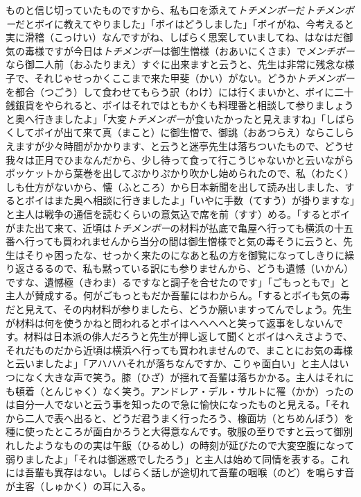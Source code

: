 \documentclass{book}
\begin{document}
ものと信じ切っていたものですから、私も口を添えて\emph{トチメンボー}だ\emph{トチメンボー}だとボイに教えてやりました」「ボイはどうしました」「ボイがね、今考えると実に滑稽（こっけい）なんですがね、しばらく思案していましてね、はなはだ御気の毒様ですが今日は\emph{トチメンボー}は御生憎様（おあいにくさま）で\emph{メンチボー}なら御二人前（おふたりまえ）すぐに出来ますと云うと、先生は非常に残念な様子で、それじゃせっかくここまで来た甲斐（かい）がない。どうか\emph{トチメンボー}を都合（つごう）して食わせてもらう訳（わけ）には行くまいかと、ボイに二十銭銀貨をやられると、ボイはそれではともかくも料理番と相談して参りましょうと奥へ行きましたよ」「大変\emph{トチメンボー}が食いたかったと見えますね」「しばらくしてボイが出て来て真（まこと）に御生憎で、御誂（おあつらえ）ならこしらえますが少々時間がかかります、と云うと迷亭先生は落ちついたもので、どうせ我々は正月でひまなんだから、少し待って食って行こうじゃないかと云いながらポッケットから葉巻を出してぷかりぷかり吹かし始められたので、私（わたく）しも仕方がないから、懐（ふところ）から日本新聞を出して読み出しました、するとボイはまた奥へ相談に行きましたよ」「いやに手数（てすう）が掛りますな」と主人は戦争の通信を読むくらいの意気込で席を前（すす）める。「するとボイがまた出て来て、近頃は\emph{トチメンボー}の材料が払底で亀屋へ行っても横浜の十五番へ行っても買われませんから当分の間は御生憎様でと気の毒そうに云うと、先生はそりゃ困ったな、せっかく来たのになあと私の方を御覧になってしきりに繰り返さるるので、私も黙っている訳にも参りませんから、どうも遺憾（いかん）ですな、遺憾極（きわま）るですなと調子を合せたのです」「ごもっともで」と主人が賛成する。何がごもっともだか吾輩にはわからん。「するとボイも気の毒だと見えて、その内材料が参りましたら、どうか願いますってんでしょう。先生が材料は何を使うかねと問われるとボイはへへへへと笑って返事をしないんです。材料は日本派の俳人だろうと先生が押し返して聞くとボイはへえさようで、それだものだから近頃は横浜へ行っても買われませんので、まことにお気の毒様と云いましたよ」「アハハハそれが落ちなんですか、こりゃ面白い」と主人はいつになく大きな声で笑う。膝（ひざ）が揺れて吾輩は落ちかかる。主人はそれにも頓着（とんじゃく）なく笑う。アンドレア・デル・サルトに罹（かか）ったのは自分一人でないと云う事を知ったので急に愉快になったものと見える。「それから二人で表へ出ると、どうだ君うまく行ったろう、橡面坊（とちめんぼう）を種に使ったところが面白かろうと大得意なんです。敬服の至りですと云って御別れしたようなものの実は午飯（ひるめし）の時刻が延びたので大変空腹になって弱りましたよ」「それは御迷惑でしたろう」と主人は始めて同情を表する。これには吾輩も異存はない。しばらく話しが途切れて吾輩の咽喉（のど）を鳴らす音が主客（しゅかく）の耳に入る。
\end{document}
